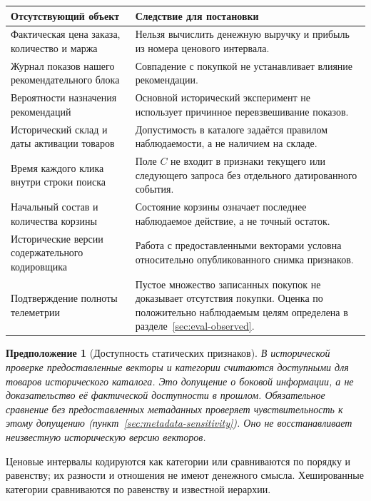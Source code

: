 \documentclass[12pt,a4paper]{article}
\theoremstyle{plainru}
\newtheorem{assumption}{Предположение}[section]
\begin{document}
\begin{longtable}{L{0.32\textwidth}L{0.60\textwidth}}
\toprule Отсутствующий объект & Следствие для постановки \\\midrule\endhead
Фактическая цена заказа, количество и маржа & Нельзя вычислить денежную
выручку и прибыль из номера ценового интервала. \\
Журнал показов нашего рекомендательного блока & Совпадение с покупкой
не устанавливает влияние рекомендации. \\
Вероятности назначения рекомендаций & Основной исторический эксперимент
не использует причинное перевзвешивание показов. \\
Исторический склад и даты активации товаров & Допустимость в каталоге
задаётся правилом наблюдаемости, а не наличием на складе. \\
Время каждого клика внутри строки поиска & Поле \(C\) не входит
в признаки текущего или следующего запроса без отдельного датированного события. \\
Начальный состав и количества корзины & Состояние корзины означает
последнее наблюдаемое действие, а не точный остаток. \\
Исторические версии содержательного кодировщика & Работа с предоставленными
векторами условна относительно опубликованного снимка признаков. \\
Подтверждение полноты телеметрии & Пустое множество записанных покупок
не доказывает отсутствия покупки. Оценка по положительно наблюдаемым
целям определена в разделе~\ref{sec:eval-observed}. \\
\bottomrule
\end{longtable}

\begin{assumption}[Доступность статических признаков]\label{ass:static-content}
В исторической проверке предоставленные векторы и категории
считаются доступными для товаров исторического каталога. Это допущение
о боковой информации, а не доказательство её фактической доступности
в прошлом. Обязательное сравнение без предоставленных метаданных проверяет
чувствительность к этому допущению (пункт~\ref{sec:metadata-sensitivity}).
Оно не восстанавливает неизвестную историческую версию векторов.
\end{assumption}

Ценовые интервалы кодируются как категории или сравниваются по порядку
и равенству; их разности и отношения не имеют денежного смысла.
Хешированные категории сравниваются по равенству и известной иерархии.
\end{document}
